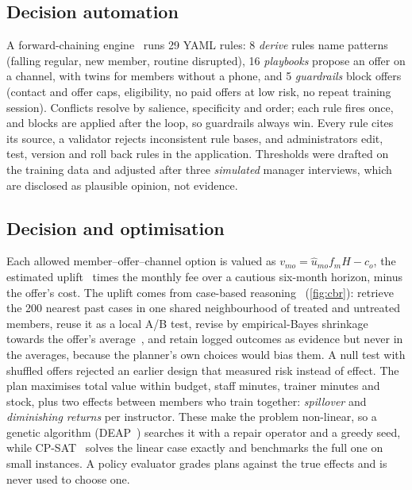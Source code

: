 \documentclass[paper=a4, fontsize=11pt, open=any, parskip=half-,
  headings=small, numbers=noenddot, captions=tableheading, toc=flat]{scrreprt}
\begin{document}
\subsection{Decision automation}
\label{sec:acquisition}

A forward-chaining engine~\cite{russell2021aima} runs 29 YAML rules: 8 \emph{derive} rules name patterns (falling regular, new member, routine disrupted), 16 \emph{playbooks} propose an offer on a channel, with twins for members without a phone, and 5 \emph{guardrails} block offers (contact and offer caps, eligibility, no paid offers at low risk, no repeat training session). Conflicts resolve by salience, specificity and order; each rule fires once, and blocks are applied after the loop, so guardrails always win. Every rule cites its source, a validator rejects inconsistent rule bases, and administrators edit, test, version and roll back rules in the application. Thresholds were drafted on the training data and adjusted after three \emph{simulated} manager interviews, which are disclosed as plausible opinion, not evidence.

\subsection{Decision and optimisation}

Each allowed member--offer--channel option is valued as $v_{mo} = \hat u_{mo} f_m H - c_o$, the estimated uplift~\cite{radcliffe2007uplift} times the monthly fee over a cautious six-month horizon, minus the offer's cost. The uplift comes from case-based reasoning~\cite{aamodt1994cbr} (\cref{fig:cbr}): retrieve the 200 nearest past cases in one shared neighbourhood of treated and untreated members, reuse it as a local A/B test, revise by empirical-Bayes shrinkage towards the offer's average~\cite{efron1975stein}, and retain logged outcomes as evidence but never in the averages, because the planner's own choices would bias them. A null test with shuffled offers rejected an earlier design that measured risk instead of effect. The plan maximises total value within budget, staff minutes, trainer minutes and stock, plus two effects between members who train together: \emph{spillover} and \emph{diminishing returns} per instructor. These make the problem non-linear, so a genetic algorithm (DEAP~\cite{fortin2012deap}) searches it with a repair operator and a greedy seed, while CP-SAT~\cite{ortools} solves the linear case exactly and benchmarks the full one on small instances. A policy evaluator grades plans against the true effects and is never used to choose one.
\end{document}
